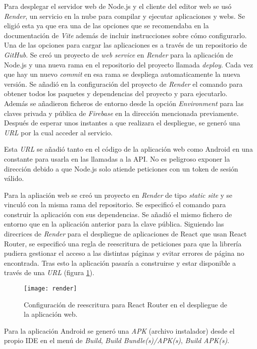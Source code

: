 Para desplegar el servidor web de Node.js y el cliente del editor web se usó \textit{Render}\cite{render}, un servicio en la nube para compilar y ejecutar aplicaciones y webs. Se eligió esta ya que era una de las opciones que se recomendaba en la documentación de \textit{Vite}\cite{vite} además de incluir instrucciones sobre cómo configurarlo. Una de las opciones para cargar las aplicaciones es a través de un repositorio de \textit{GitHub}. Se creó un proyecto de \textit{web service} en \textit{Render} para la aplicación de Node.js y una nueva rama en el repositorio del proyecto llamada \textit{deploy}. Cada vez que hay un nuevo \textit{commit} en esa rama se despliega automaticamente la nueva versión. Se añadió en la configuración del proyecto de \textit{Render} el comando  para obtener todos los paquetes y dependencias del proyecto y   para ejecutarlo. Además se añadieron ficheros de entorno desde la opción \textit{Environment} para las claves privada y pública de \textit{Firebase} en la dirección mencionada previamente. Después de esperar unos instantes a que realizara el despliegue, se generó una \textit{URL} por la cual acceder al servicio.

Esta \textit{URL} se añadió tanto en el código de la aplicación web como Android en una constante para usarla en las llamadas a la API. No es peligroso exponer la dirección debido a que Node.js solo atiende peticiones con un token de sesión válido.

Para la apliación web se creó un proyecto en \textit{Render} de tipo \textit{static site} y se vinculó con la misma rama del repositorio. Se especificó el comando  para construir la aplicación con sus dependencias. Se añadió el mismo fichero de entorno que en la aplicación anterior para la clave pública. Siguiendo las direcrices de \textit{Render} para el despliegue de aplicaciones de React que usan React Router, se especificó una regla de reescritura de peticiones para que la librería pudiera gestionar el acceso a las distintas páginas y evitar errores de página no encontrada. Tras esto la aplicación pasaría a construirse y estar disponible a través de una \textit{URL} (figura \ref{fig:render}).

\begin{figure}[h]
    \centering
    \texttt{[image: render]}
    \caption[Reescritura de peticiones para React Router]{Configuración de reescritura para React Router en el despliegue de la aplicación web.}
    \label{fig:render}
\end{figure}

Para la aplicación Android se generó una \textit{APK} (archivo instalador) desde el propio IDE en el menú de \textit{Build}, \textit{Build Bundle(s)/APK(s)}, \textit{Build APK(s)}.